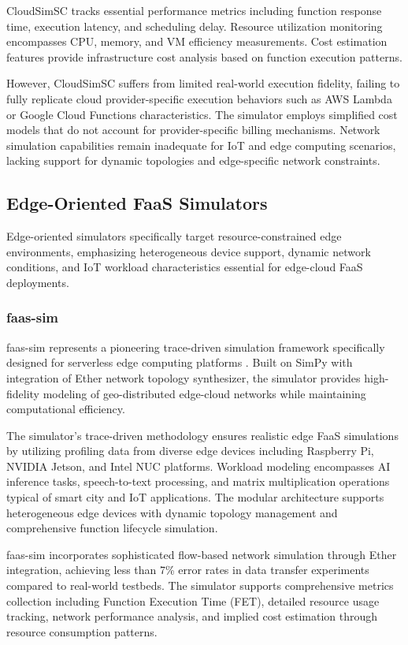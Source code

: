 CloudSimSC tracks essential performance metrics including function response time, execution latency, and scheduling delay. Resource utilization monitoring encompasses CPU, memory, and VM efficiency measurements. Cost estimation features provide infrastructure cost analysis based on function execution patterns.

However, CloudSimSC suffers from limited real-world execution fidelity, failing to fully replicate cloud provider-specific execution behaviors such as AWS Lambda or Google Cloud Functions characteristics. The simulator employs simplified cost models that do not account for provider-specific billing mechanisms. Network simulation capabilities remain inadequate for IoT and edge computing scenarios, lacking support for dynamic topologies and edge-specific network constraints.

\subsection{Edge-Oriented FaaS Simulators}

Edge-oriented simulators specifically target resource-constrained edge environments, emphasizing heterogeneous device support, dynamic network conditions, and IoT workload characteristics essential for edge-cloud FaaS deployments.

\subsubsection{faas-sim}

faas-sim represents a pioneering trace-driven simulation framework specifically designed for serverless edge computing platforms \cite{boughzala2022faassim}. Built on SimPy with integration of Ether network topology synthesizer, the simulator provides high-fidelity modeling of geo-distributed edge-cloud networks while maintaining computational efficiency.

The simulator's trace-driven methodology ensures realistic edge FaaS simulations by utilizing profiling data from diverse edge devices including Raspberry Pi, NVIDIA Jetson, and Intel NUC platforms. Workload modeling encompasses AI inference tasks, speech-to-text processing, and matrix multiplication operations typical of smart city and IoT applications. The modular architecture supports heterogeneous edge devices with dynamic topology management and comprehensive function lifecycle simulation.

faas-sim incorporates sophisticated flow-based network simulation through Ether integration, achieving less than 7\% error rates in data transfer experiments compared to real-world testbeds. The simulator supports comprehensive metrics collection including Function Execution Time (FET), detailed resource usage tracking, network performance analysis, and implied cost estimation through resource consumption patterns.

